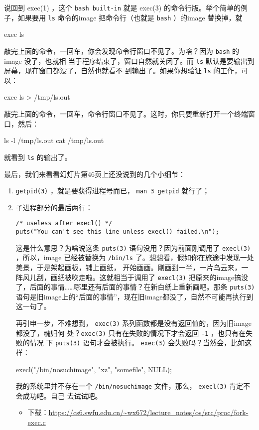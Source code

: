 \documentclass{wx672ctexart}
\begin{document}
说回到 exec(1) ，这个 \texttt{bash built-in} 就是 exec(3) 的命令行版。举个简单的例子，如果要用
\texttt{ls} 命令的image 把命令行（也就是 \texttt{bash} ）的image 替换掉，就
\begin{shellcode}
exec ls
\end{shellcode}
敲完上面的命令，一回车，你会发现命令行窗口不见了。为啥？因为 \texttt{bash} 的 image 没了，也就相
当于程序结束了，窗口自然就关闭了。而 \texttt{ls} 默认是要输出到屏幕，现在窗口都没了，自然也就看不
到输出了。如果你想验证 \texttt{ls} 的工作，可以：
\begin{shellcode}
exec ls > /tmp/ls.out
\end{shellcode}
敲完上面的命令，一回车，命令行窗口不见了。这时，你只要重新打开一个终端窗口，然后：
\begin{shellcode}
ls -l /tmp/ls.out
cat /tmp/ls.out
\end{shellcode}
就看到 \texttt{ls} 的输出了。

最后，我们来看看幻灯片第46页上还没说到的几个小细节：
\begin{enumerate}
\item \texttt{getpid(3)} ，就是要获得进程号而已， \texttt{man 3 getpid} 就行了；
\item 子进程部分的最后两行：
\begin{verbatim}
/* useless after execl() */
puts("You can't see this line unless execl() failed.\n");
\end{verbatim}
这是什么意思？为啥说这条 \texttt{puts(3)} 语句没用？因为前面刚调用了 \texttt{execl(3)} ，所以，image
已经被替换为 \texttt{/bin/ls} 了。想想看，假如你在旅途中发现一处美景，于是架起画板，铺上画纸，
开始画画。刚画到一半，一片乌云来，一阵风儿刮，画纸被吹走啦。这就相当于调用了 \texttt{execl(3)}
把原来的image搞没了，后面的事情……哪里还有后面的事情？在新白纸上重新画吧。那条 \texttt{puts(3)}
语句是旧image上的“后面的事情”，现在旧image都没了，自然不可能再执行到这一句了。

再引申一步，不难想到， \texttt{exec(3)} 系列函数都是没有返回值的，因为旧image都没了，魂归何
处？\texttt{exec(3)} 只有在失败的情况下才会返回 \texttt{-1} ，也只有在失败的情况
下 \texttt{puts(3)} 语句才会被执行。 \texttt{exec(3)} 会失败吗？当然会，比如这样：

\begin{ccode}
execl("/bin/nosuchimage", "xz", "somefile", NULL);
\end{ccode}

我的系统里并不存在一个 \texttt{/bin/nosuchimage} 文件，那么， \texttt{execl(3)} 肯定不会成功吧。自己
去试试吧。
\begin{itemize}
\item 下载：\url{https://cs6.swfu.edu.cn/\~wx672/lecture\_notes/os/src/proc/fork-exec.c}
\end{itemize}
\end{enumerate}
\end{document}
